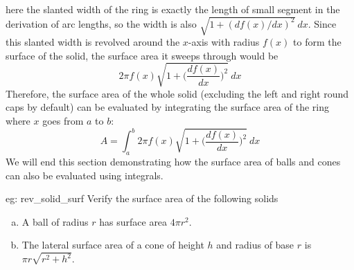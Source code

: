 here the slanted width of the ring is exactly the length of small segment in the derivation of arc lengths, so the width is also $\sqrt{1+(df(x)/dx)^2}~dx$.  Since this slanted width is revolved around the $x$-axis with radius $f(x)$ to form the surface of the solid, the surface area it sweeps through would be
\[2\pi f(x) \sqrt{1+\Big(\frac{df(x)}{dx}\Big)^2}~dx\]
Therefore, the surface area of the whole solid (excluding the left and right round caps by default) can be evaluated by integrating the surface area of the ring where $x$ goes from $a$ to $b$:
\[A = \int_a^b 2\pi f(x) \sqrt{1+\Big(\frac{df(x)}{dx}\Big)^2}~dx\]
We will end this section demonstrating how the surface area of balls and cones can also be evaluated using integrals.

\begin{eg}[]{eg: rev_solid_surf}
    Verify the surface area of the following solids
    \begin{enumerate}[a)]
        \item A ball of radius $r$ has surface area $4\pi r^2$.
        \item The lateral surface area of a cone of height $h$ and radius of base $r$ is $\pi r \sqrt{r^2+h^2}$.
    \end{enumerate}
\end{eg}

